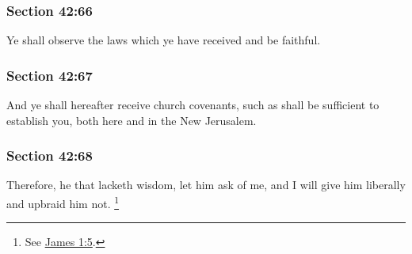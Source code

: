	\subsubsection{Section 42:66} %
		\label{DC42-66}

		Ye shall observe the laws which ye have received and be faithful.


	\subsubsection{Section 42:67} %
		\label{DC42-67}

		And ye shall hereafter receive church covenants, such as shall be sufficient to establish you, both here and in the New Jerusalem.


	\subsubsection{Section 42:68} %
		\label{DC42-68}

		Therefore, he that lacketh wisdom, let him ask of me, and I will give him liberally and upbraid him not.%
			\footnote{%
				See \hyperref[JAMES-1-5]{James 1:5}.
				}


